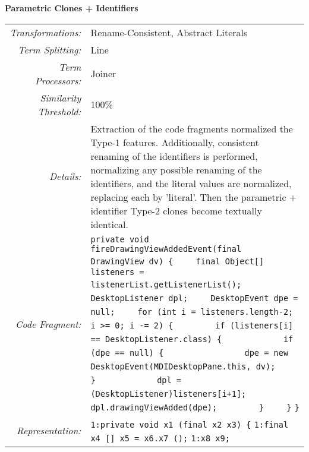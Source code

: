 \documentclass[]{article}
\begin{document}
	\noindent\begin{minipage}{\textwidth}
	\noindent \textbf{Parametric Clones + Identifiers}\\
	\begin{tabular}{rp{12.5cm}}
	\bottomrule[2pt]
	\textit{Transformations:} & Rename-Consistent, Abstract Literals \\
	\textit{Term Splitting:}  & Line\\
	\textit{Term Processors:} & Joiner \\
	\textit{Similarity Threshold:} & 100\% \\
	\midrule
	\textit{Details:}         & Extraction of the code fragments normalized the Type-1 features.  Additionally, consistent renaming of the identifiers is performed, normalizing any possible renaming of the identifiers, and the literal values are normalized, replacing each by 'literal'.  Then the parametric + identifier Type-2 clones become textually identical.\\
	\midrule
	\textit{Code Fragment:} &
	\verb|private void fireDrawingViewAddedEvent(final DrawingView dv) {|\newline
	\verb|    final Object[] listeners = listenerList.getListenerList();|\newline
	\verb|    DesktopListener dpl;|\newline
	\verb|    DesktopEvent dpe = null;|\newline
	\verb|    for (int i = listeners.length-2; i >= 0; i -= 2) {|\newline
	\verb|        if (listeners[i] == DesktopListener.class) {|\newline
	\verb|            if (dpe == null) {|\newline
	\verb|                dpe = new DesktopEvent(MDIDesktopPane.this, dv);|\newline
	\verb|            }|\newline
	\verb|            dpl = (DesktopListener)listeners[i+1];|\newline
	\verb|            dpl.drawingViewAdded(dpe);|\newline
	\verb|        }|\newline
	\verb|    }|\newline
	\verb|}|\newline
	\\
	\textit{Representation:} & 
	\verb|1:private void x1 (final x2 x3) {|\newline
	\verb|1:final x4 [] x5 = x6.x7 ();|\newline
	\verb|1:x8 x9;|\newline

\end{tabular}
\end{minipage}
\end{document}
